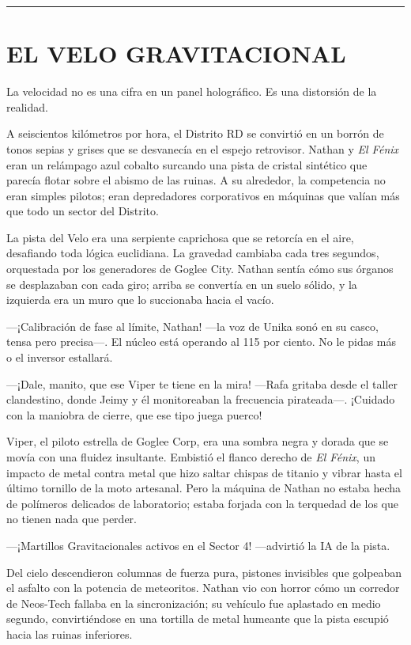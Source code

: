 \documentclass[12pt,a4paper]{book}
\begin{document}
\bigskip
\noindent\rule{\textwidth}{0.4pt}
\bigskip

\chapter{EL VELO GRAVITACIONAL}

La velocidad no es una cifra en un panel holográfico. Es una distorsión de la realidad.

A seiscientos kilómetros por hora, el Distrito RD se convirtió en un borrón de tonos sepias y grises que se desvanecía en el espejo retrovisor. Nathan y \textit{El Fénix} eran un relámpago azul cobalto surcando una pista de cristal sintético que parecía flotar sobre el abismo de las ruinas. A su alrededor, la competencia no eran simples pilotos; eran depredadores corporativos en máquinas que valían más que todo un sector del Distrito.

La pista del Velo era una serpiente caprichosa que se retorcía en el aire, desafiando toda lógica euclidiana. La gravedad cambiaba cada tres segundos, orquestada por los generadores de Goglee City. Nathan sentía cómo sus órganos se desplazaban con cada giro; arriba se convertía en un suelo sólido, y la izquierda era un muro que lo succionaba hacia el vacío.

---¡Calibración de fase al límite, Nathan! ---la voz de Unika sonó en su casco, tensa pero precisa---. El núcleo está operando al 115 por ciento. No le pidas más o el inversor estallará.

---¡Dale, manito, que ese Viper te tiene en la mira! ---Rafa gritaba desde el taller clandestino, donde Jeimy y él monitoreaban la frecuencia pirateada---. ¡Cuidado con la maniobra de cierre, que ese tipo juega puerco!

Viper, el piloto estrella de Goglee Corp, era una sombra negra y dorada que se movía con una fluidez insultante. Embistió el flanco derecho de \textit{El Fénix}, un impacto de metal contra metal que hizo saltar chispas de titanio y vibrar hasta el último tornillo de la moto artesanal. Pero la máquina de Nathan no estaba hecha de polímeros delicados de laboratorio; estaba forjada con la terquedad de los que no tienen nada que perder.

---¡Martillos Gravitacionales activos en el Sector 4! ---advirtió la IA de la pista.

Del cielo descendieron columnas de fuerza pura, pistones invisibles que golpeaban el asfalto con la potencia de meteoritos. Nathan vio con horror cómo un corredor de Neos-Tech fallaba en la sincronización; su vehículo fue aplastado en medio segundo, convirtiéndose en una tortilla de metal humeante que la pista escupió hacia las ruinas inferiores.
\end{document}

